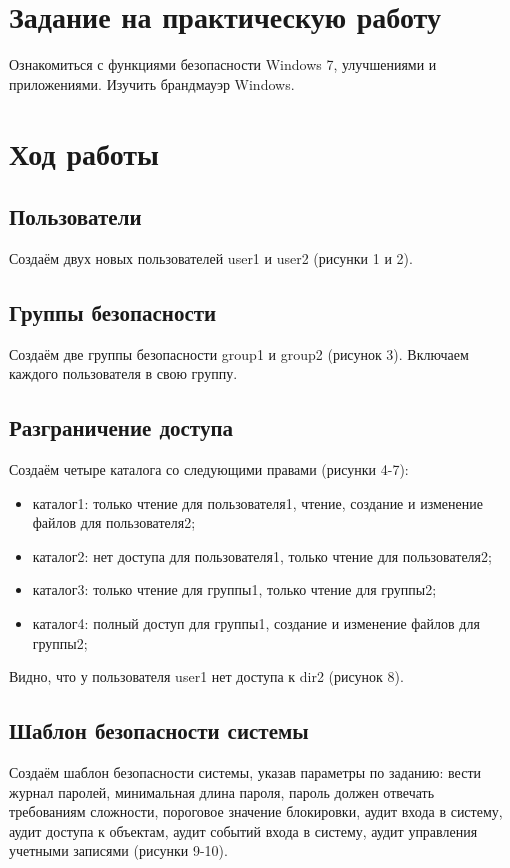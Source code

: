 \section{Задание на практическую работу}
Ознакомиться с функциями безопасности Windows 7, улучшениями и приложениями. Изучить брандмауэр Windows.



\section{Ход работы}
\subsection{Пользователи}
Создаём двух новых пользователей user1 и user2 (рисунки 1 и 2). 
\FloatBarrier

\subsection{Группы безопасности}
Создаём две группы безопасности group1 и group2 (рисунок 3). Включаем каждого пользователя в свою группу. 
\FloatBarrier

\subsection{Разграничение доступа}
Создаём четыре каталога со следующими правами (рисунки 4-7):
\begin{itemize}
    \item каталог1: только чтение для пользователя1, чтение, создание и изменение файлов
    для пользователя2;
    \item каталог2: нет доступа для пользователя1, только чтение для пользователя2;
    \item каталог3: только чтение для группы1, только чтение для группы2;
    \item каталог4: полный доступ для группы1, создание и изменение файлов для группы2;
\end{itemize}
\FloatBarrier
Видно, что у пользователя user1 нет доступа к dir2 (рисунок 8).
\FloatBarrier

\subsection{Шаблон безопасности системы}
Создаём шаблон безопасности системы, указав параметры по заданию: вести журнал паролей, минимальная длина пароля, пароль должен отвечать требованиям сложности, пороговое значение блокировки, аудит входа в систему, аудит доступа к объектам, аудит событий входа в систему, аудит управления учетными записями (рисунки 9-10).

